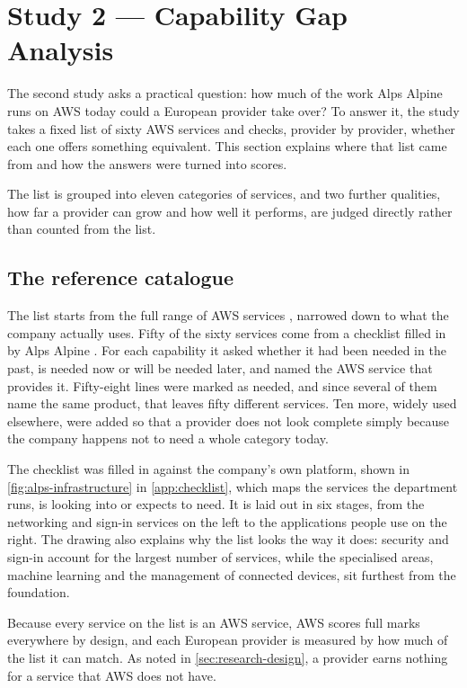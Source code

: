 \section{Study 2 --- Capability Gap Analysis}
\label{sec:method-study2}

The second study asks a practical question: how much of the work Alps Alpine runs on
\acs{AWS} today could a European provider take over? To answer it, the study takes a
fixed list of sixty \acs{AWS} services and checks, provider by provider, whether
each one offers something equivalent. This section explains where that list came
from and how the answers were turned into scores.

The list is grouped into eleven categories of services, and two further qualities,
how far a provider can grow and how well it performs, are judged directly rather
than counted from the list.

\subsection*{The reference catalogue}

The list starts from the full range of \acs{AWS} services \cite{AWS_Products},
narrowed down to what the company actually uses. Fifty of the sixty services come
from a checklist filled in by Alps Alpine \cite{AlpsAlpine_Checklist}. For each
capability it asked whether it had been needed in the past, is needed now or will
be needed later, and named the \acs{AWS} service that provides it. Fifty-eight lines
were marked as needed, and since several of them name the same product, that leaves
fifty different services. Ten more, widely used elsewhere, were added so that a
provider does not look complete simply because the company happens not to need a
whole category today.

The checklist was filled in against the company's own platform, shown in
\cref{fig:alps-infrastructure} in \cref{app:checklist}, which maps the services the
department runs, is looking into or expects to need. It is laid out in six stages,
from the networking and sign-in services on the left to the applications people use
on the right. The drawing also explains why the list looks the way it does: security
and sign-in account for the largest number of services, while the specialised areas,
machine learning and the management of connected devices, sit furthest from the
foundation.

Because every service on the list is an \acs{AWS} service, \acs{AWS} scores full
marks everywhere by design, and each European provider is measured by how much of
the list it can match. As noted in \cref{sec:research-design}, a provider earns
nothing for a service that \acs{AWS} does not have.


